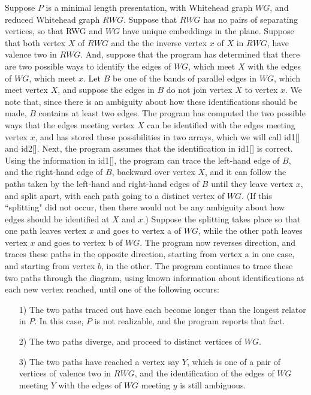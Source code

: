 \documentclass[12pt]{amsart}
\begin{document}
                Suppose $P$ is a minimal length presentation, with Whitehead graph $WG$, and reduced
        Whitehead graph $RWG$. Suppose that $RWG$ has no pairs of separating vertices, so that RWG
        and $WG$ have unique embeddings in the plane. Suppose that both vertex $X$ of $RWG$ and the
        the inverse vertex $x$ of $X$ in $RWG$, have valence two in $RWG$. And, suppose that the program
        has determined that there are two possible ways to identify the edges of $WG$, which meet
        $X$ with the edges of $WG$, which meet $x$. Let $B$ be one of the bands of parallel edges in $WG$,
        which meet vertex $X$, and suppose the edges in $B$ do not join vertex $X$ to vertex $x$. We note
        that, since there is an ambiguity about how these identifications should be made, $B$
        contains at least two edges.
                The program has computed the two possible ways that the edges meeting vertex $X$ can
        be identified with the edges meeting vertex $x$, and has stored these possibilities in two
        arrays, which we will call id1[] and id2[]. Next, the program assumes that the
        identification in id1[] is correct. Using the information in id1[], the program can 
        trace the left-hand edge of $B$, and the right-hand edge of $B$, backward over vertex $X$, and
        it can follow the paths taken by the left-hand and right-hand edges of $B$ until they leave
        vertex $x$, and split apart, with each path going to a distinct vertex of $WG$. (If this
         ``splitting" did not occur, then there would not be any ambiguity about how edges should
        be identified at $X$ and $x$.)
                Suppose the splitting takes place so that one path leaves vertex $x$ and goes to vertex
        a of $WG$, while the other path leaves vertex $x$ and goes to vertex b of $WG$. The program now
        reverses direction, and traces these paths in the opposite direction, starting from vertex
        a in one case, and starting from vertex $b$, in the other. The program continues to trace
        these two paths through the diagram, using known information about identifications at each
        new vertex reached, until one of the following occurs:
                \begin{enumerate}
                \item[1)]      The two paths traced out have each become longer than the longest relator in $P$. In
                        this case, $P$ is not realizable, and the program reports that fact.
                
                \item[2)]      The two paths diverge, and proceed to distinct vertices of $WG$.
                
                \item[3)]      The two paths have reached a vertex say $Y$, which is one of a pair of vertices of
                        valence two in $RWG$, and the identification of the edges of $WG$ meeting $Y$ with the
                        edges of $WG$ meeting $y$ is still ambiguous.
                        
                      \end{enumerate}
\end{document}
